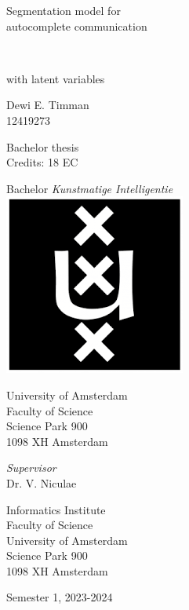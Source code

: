 \documentclass[a4paper, 12pt]{report}
\newcommand{\theTitle}{Segmentation model for \\
\vspace{0.5em}
autocomplete communication}
\newcommand{\theSubTitle}{with latent variables}
\newcommand{\theAuthor}{Dewi E. Timman}
\newcommand{\theStudentID}{12419273}
\newcommand{\theSupervisor}{Dr. V. Niculae} %
\newcommand{\theInstitute}{
Informatics Institute \\ %
Faculty of Science\\
University of Amsterdam\\
Science Park 900 \\ 
1098 XH Amsterdam 
}
\newcommand{\theDate}{Semester 1, 2023-2024}
\begin{document}
\pagestyle{empty}
\begin{center}

\vspace{2.5cm}


\begin{Huge}
\theTitle
\end{Huge} \\

\vspace{0.5 cm}

\begin{Large}
\theSubTitle
\end{Large}

\vspace{1.5cm}

\theAuthor\\
\theStudentID

\vspace{1.5cm}

Bachelor thesis\\
Credits: 18 EC

\vspace{0.5cm}

Bachelor \textit{Kunstmatige Intelligentie} \\
\vspace{0.25cm}
\includegraphics[width=0.075\paperwidth]{figs/uva_logo} \\
\vspace{0.1cm}

University of Amsterdam\\
Faculty of Science\\
Science Park 900\\
1098 XH Amsterdam

\vspace{2cm}

\emph{Supervisor}\\

\theSupervisor

\vspace{0.25cm}

\theInstitute

\vspace{1.0cm}

\theDate

\end{center}
\newpage
\end{document}
